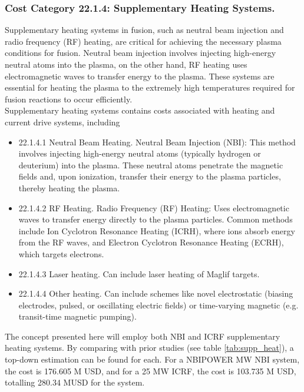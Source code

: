 \subsubsection*{Cost Category 22.1.4: Supplementary Heating Systems.}

Supplementary heating systems in fusion, such as neutral beam injection and radio frequency (RF) heating, are critical for achieving the necessary plasma conditions for fusion. Neutral beam injection involves injecting high-energy neutral atoms into the plasma, on the other hand, RF heating uses electromagnetic waves to transfer energy to the plasma. These systems are essential for heating the plasma to the extremely high temperatures required for fusion reactions to occur efficiently.\\

Supplementary heating systems contains costs associated with heating and current drive systems, including 

\begin{itemize}
    \item 22.1.4.1 Neutral Beam Heating.   Neutral Beam Injection (NBI): This method involves injecting high-energy neutral atoms (typically hydrogen or deuterium) into the plasma. These neutral atoms penetrate the magnetic fields and, upon ionization, transfer their energy to the plasma particles, thereby heating the plasma.
    \item 22.1.4.2 RF Heating.  Radio Frequency (RF) Heating: Uses electromagnetic waves to transfer energy directly to the plasma particles. Common methods include Ion Cyclotron Resonance Heating (ICRH), where ions absorb energy from the RF waves, and Electron Cyclotron Resonance Heating (ECRH), which targets electrons.
    \item 22.1.4.3 Laser heating.  Can include laser heating of Maglif targets.
    \item 22.1.4.4 Other heating.  Can include schemes like novel electrostatic (biasing electrodes, pulsed, or oscillating electric fields) or time-varying magnetic (e.g. transit-time magnetic pumping).
\end{itemize}


The concept presented here will employ both NBI and ICRF supplementary heating systems. By comparing with prior studies (see table \ref{tab:supp_heat}), a top-down estimation can be found for each. For a NBIPOWER MW NBI system, the cost is 176.605 M USD, and for a 25 MW ICRF, the cost is 103.735 M USD, totalling 280.34 MUSD for the system.

